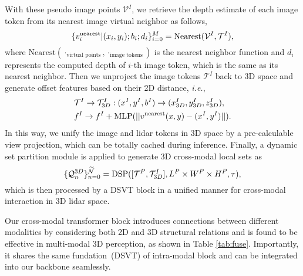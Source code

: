 \documentclass[10pt,twocolumn,letterpaper]{article}
\begin{document}
With these pseudo image points $\mathcal{V}^I$, we retrieve the depth estimate of each image token from its nearest image virtual neighbor as follows,
\vspace{-2pt}
\begin{equation}
\{v^{\text{nearest}}_i|(x_i, y_i);b_i;d_i\}_{i=0}^M  = \text{Nearest}( \mathcal{V}^I, \mathcal{T}^{I}),
\vspace{-2pt}
\end{equation}
where $\text{Nearest}(\cdot_{\text{virtual points}}, \cdot_{\text{image tokens}})$ is the nearest neighbor function and $d_i$ represents the computed depth of $i$-th image token, which is the same as its nearest neighbor. Then we unproject the image tokens $\mathcal{T}^{I}$ back to 3D space and generate offset features based on their 2D distance, \emph{i.e.}, 
\vspace{-2pt}
\begin{equation}
\begin{aligned}
& \mathcal{T}^I \rightarrow \mathcal{T}^I_{3D}: (x^I, y^I, b^I) \rightarrow (x_{3D}^{I}, y_{3D}^{I}, z_{3D}^{I}), \\
& f^{I} \rightarrow f^{I} + \text{MLP}(||v^{\text{nearest}}(x, y) - (x^I, y^I)||).
\end{aligned}
\vspace{-2pt}
\end{equation}
In this way, we unify the image and lidar tokens in 3D space by a pre-calculable view projection, which can be totally cached during inference. Finally, a dynamic set partition module is applied to generate 3D cross-modal local sets as 
\vspace{-2pt}
\begin{equation}
\{\mathcal{Q}^{3D}_n\}_{n\text{=}0}^{\widetilde{\mathcal{N}}}  = \text{DSP}([\mathcal{T}^P, \mathcal{T}^I_{3D}], L^P\times W^P\times H^P,\tau),
\vspace{-2pt}
\end{equation}
which is then processed by a DSVT block in a unified manner for cross-modal interaction in 3D lidar space.

Our cross-modal transformer block introduces connections between different modalities by considering both 2D and 3D structural relations and is found to be effective in multi-modal 3D perception, as shown in Table \ref{tab:fuse}. Importantly, it shares the same fundation~(DSVT) of intra-modal block and can be integrated into our backbone seamlessly.
\end{document}
